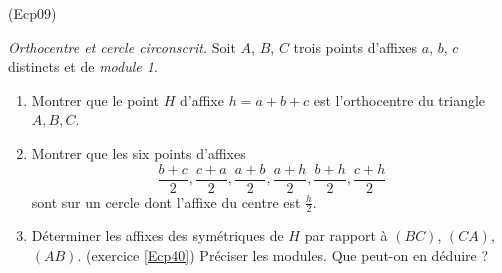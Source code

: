 \begin{tiny}(Ecp09)\end{tiny} \emph{Orthocentre et cercle circonscrit.} 
Soit $A$, $B$, $C$ trois points d'affixes $a$, $b$, $c$ distincts et de \emph{module 1}.
\begin{enumerate}
 \item Montrer que le point $H$ d'affixe $h=a+b+c$ est l'orthocentre du triangle $A,B,C$.
 \item Montrer que les six points d'affixes
\begin{displaymath}
\frac{b+c}{2},\frac{c+a}{2},\frac{a+b}{2},\frac{a+h}{2},\frac{b+h}{2},\frac{c+h}{2} 
\end{displaymath}
  sont sur un cercle dont l'affixe du centre est $\frac{h}{2}$.
  \item Déterminer les affixes des symétriques de $H$ par rapport à $(BC)$, $(CA)$, $(AB)$. (exercice \ref{Ecp40}) Préciser les modules. Que peut-on en déduire ?
\end{enumerate}

   